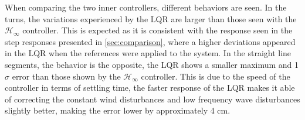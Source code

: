 When comparing the two inner controllers, different behaviors are seen. In the turns, the variations experienced by the LQR are larger than those seen with the $\mathcal{H}_\infty$ controller. This is expected as it is consistent with the response seen in the step responses presented in \autoref{sec:comparison}, where a higher deviations appeared in the LQR when the references were applied to the system. 
In the straight line segments, the behavior is the opposite, the LQR shows a smaller maximum and 1$\sigma$ error than those shown by the $\mathcal{H}_\infty$ controller. This is due to the speed of the controller in terms of settling time, the faster response of the LQR makes it able of correcting the constant wind disturbances and low frequency wave disturbances slightly better, making the error lower by approximately 4 cm.
